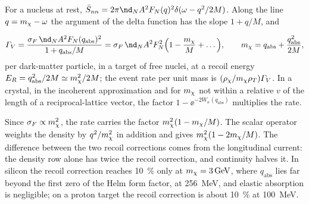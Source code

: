 For a nucleus at rest, $\bar S_{nn} = 2\pi\nd_NA^2F_N(q)^2\delta(\omega - q^2/2M)$. Along the line $q = m_{\chi} - \omega$ the argument of the delta function has the slope $1 + q/M$, and
\begin{keyresult}
\begin{equation}
  \varGamma_V = \frac{\sigma_F\,\nd_NA^2F_N(q_{\mathrm{abs}})^2}{1 + q_{\mathrm{abs}}/M} = \sigma_F\,\nd_NA^2F_N^2\Bigl(1 - \frac{\mchi}{M} + \dots\Bigr) , \qquad \mchi = q_{\mathrm{abs}} + \frac{q_{\mathrm{abs}}^2}{2M} ,
  \label{eq:11.4-ferm-nuc}
\end{equation}
per dark-matter particle, in a target of free nuclei, at a recoil energy $E_R = q_{\mathrm{abs}}^2/2M \simeq m_{\chi}^2/2M$; the event rate per unit mass is $(\rho_\chi/m_{\chi}\rho_T)\varGamma_V$. In a crystal, in the incoherent approximation and for $m_{\chi}$ not within a relative $v$ of the length of a reciprocal-lattice vector, the factor $1 - \ee^{-2W_\kappa(q_{\mathrm{abs}})}$ multiplies the rate.
\end{keyresult}
\noindent Since $\sigma_F \propto m_{\chi}^2$, the rate carries the factor $m_{\chi}^2(1 - m_{\chi}/M)$. The scalar operator weights the density by $q^2/m_{\chi}^2$ in addition and gives $m_{\chi}^2(1 - 2m_{\chi}/M)$. The difference between the two recoil corrections comes from the longitudinal current: the density row alone has twice the recoil correction, and continuity halves it. In silicon the recoil correction reaches \SI{10}{\percent} only at $m_{\chi} = \SI{3}{GeV}$, where $q_{\mathrm{abs}}$ lies far beyond the first zero of the Helm form factor, at \SI{256}{MeV}, and elastic absorption is negligible; on a proton target the recoil correction is about \SI{10}{\percent} at \SI{100}{MeV}.

